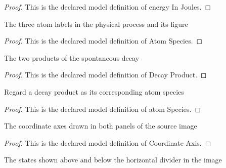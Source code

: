 \begin{proof}
  This is the declared model definition of energy In Joules.
\end{proof}
\begin{definition}
  \label{def:physics:phyx-mini-0551:phyxminiproblems-problemphyxmini0551-atomspecies}
  The three atom labels in the physical process and its figure
\end{definition}
\begin{proof}
  This is the declared model definition of Atom Species.
\end{proof}
\begin{definition}
  \label{def:physics:phyx-mini-0551:phyxminiproblems-problemphyxmini0551-decayproduct}
  The two products of the spontaneous decay
\end{definition}
\begin{proof}
  This is the declared model definition of Decay Product.
\end{proof}
\begin{definition}
  \label{def:physics:phyx-mini-0551:phyxminiproblems-problemphyxmini0551-decayproduct-atomspecies}
  Regard a decay product as its corresponding atom species
\end{definition}
\begin{proof}
  This is the declared model definition of atom Species.
\end{proof}
\begin{definition}
  \label{def:physics:phyx-mini-0551:phyxminiproblems-problemphyxmini0551-coordinateaxis}
  The coordinate axes drawn in both panels of the source image
\end{definition}
\begin{proof}
  This is the declared model definition of Coordinate Axis.
\end{proof}
\begin{definition}
  \label{def:physics:phyx-mini-0551:phyxminiproblems-problemphyxmini0551-figurepanel}
  The states shown above and below the horizontal divider in the image
\end{definition}
